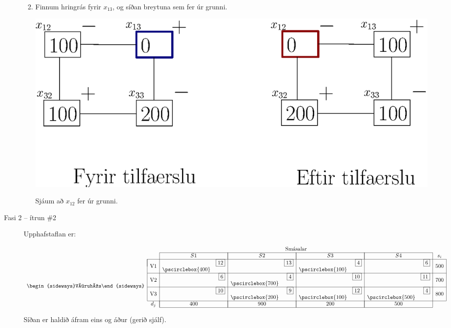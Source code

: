 \begin{lausn}
\begin{description}
\begin{enumerate}
\newpage
\item Finnum hringrás fyrir $x_{13}$, og síðan breytuna sem fer úr grunni. 
\begin{center}
 \includegraphics[width=0.6\columnwidth]{figs/flutn_bestun_hringras.eps}
\end{center}
Sjáum að $x_{12}$ fer úr grunni.
\end{enumerate}

\item[Fasi 2 -- ítrun \#2] Upphafstaflan er:
\begin{center}
\[ \begin{array}{cccr|cr|cr|crcc}
 & & \multicolumn{8}{c}{\mbox{Smásalar}} \\ \cline{3-10}
 & & \multicolumn{2}{|c|}{S1} & \multicolumn{2}{|c|}{S2} & \multicolumn{2}{|c|}{S3}& \multicolumn{2}{|c|}{S4} & s_i \\ \cline{2-11}
\multicolumn{1}{c|}{\multirow{8}{*}{\begin{sideways}Vöruhús\end{sideways}}} 
& \multicolumn{1}{|c|}{\multirow{2}{*}{V1}} &   & \scriptscriptstyle{\fbox{12}}&    & \scriptscriptstyle{\fbox{13}} & & \scriptscriptstyle{\fbox{4}}& & \scriptscriptstyle{\fbox{6}} & \multicolumn{1}{|c|}{\multirow{2}{*}{500}}  \\ 
& \multicolumn{1}{|c|}{                  } & \pscirclebox{400} & & &    &\pscirclebox{100} &   & & & \multicolumn{1}{|c|}{}\\ \cline{2-11}
& \multicolumn{1}{|c|}{\multirow{2}{*}{V2}} &   & \scriptscriptstyle{\fbox{6}}&    & \scriptscriptstyle{\fbox{4}} & & \scriptscriptstyle{\fbox{10}}& & \scriptscriptstyle{\fbox{11}} & \multicolumn{1}{|c|}{\multirow{2}{*}{700}}  \\ 
& \multicolumn{1}{|c|}{                  } &  &    & \pscirclebox{700}&    & & &&   & \multicolumn{1}{|c|}{}\\ \cline{2-11}
& \multicolumn{1}{|c|}{\multirow{2}{*}{V3}} &   & \scriptscriptstyle{\fbox{10}}&    & \scriptscriptstyle{\fbox{9}} &  & \scriptscriptstyle{\fbox{12}} & & \scriptscriptstyle{\fbox{4}} & \multicolumn{1}{|c|}{\multirow{2}{*}{800}} \\ 
& \multicolumn{1}{|c|}{                  } &   &    & \pscirclebox{200}&    & \pscirclebox{100}&   & \pscirclebox{500}& & \multicolumn{1}{|c|}{\multirow{2}{*}{}}\\ \cline{2-11}
&  \multicolumn{1}{c|}{d_j}& \multicolumn{2}{|c|}{400} & \multicolumn{2}{|c|}{900} & \multicolumn{2}{|c|}{200} &\multicolumn{2}{|c|}{500} & \\ \cline{3-10}
\end{array}
\]
\end{center}
 Síðan er haldið áfram eins og áður (gerið sjálf).
\end{description}
\end{lausn}
\newpage
